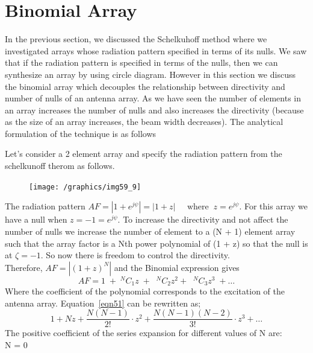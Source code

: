 \chapter{Binomial Array}	
In the previous section, we discussed the Schelkuhoff method where we investigated arrays whose radiation pattern specified in terms of its nulls. We saw that if the radiation pattern is specified in terms of the nulls, then we can synthesize an array by using circle diagram. However in this section we discuss the binomial array which decouples the relationship between directivity and number of nulls of an antenna array. As we have seen the number of elements in an array increases the number of nulls and also increases the directivity (because as the size of an array increases, the beam width decreases). The analytical formulation of the technique is as follows

Let's consider a 2 element array and specify the radiation pattern from the schelkunoff therom as follows.\\
\begin{figure}[h]
\centering
\texttt{[image: /graphics/img59\_9]}
\caption{}
\label{fig:fig-11}
\end{figure}

The radiation pattern $AF = |1 + e^{j\psi}| = |1 + z| \; \; \; \; \; \text{where} \; \; z =  e^{j\psi}$. For this array we have a null when $z = -1 =  e^{j\psi}$. To increase the directivity and not affect the number of nulls we increase the number of element to a (N + 1) element array such that the array factor is a Nth power polynomial of (1 + z) so that the null is at $\zeta = -1$. So now there is freedom to control the directivity.\\
Therefore, $AF = |(1 + z)^N|$ and the Binomial expression gives 
\begin{equation}
AF = 1\;  +\;  {^NC_1z} \; +\; \; {^NC_2z^2} +\; \; {^NC_3z^3} \; + \ldots
\label{eqn51}
\end{equation}
Where the coefficient of the polynomial corresponds to the excitation of the antenna array. Equation~\ref{eqn51} can be rewritten as;
\begin{equation}
1 + Nz + \dfrac{N(N - 1)}{2!}\cdot z^2 + \dfrac{N(N - 1)(N - 2)}{3!}\cdot z^3 + \ldots\label{eqn52}
\end{equation}
The positive coefficient of the series expansion for different values of N are:\\

N = 0\; \; \; \; \; \; \; \; \; \; \; \; \; \; \;\; \; \; \; \\

